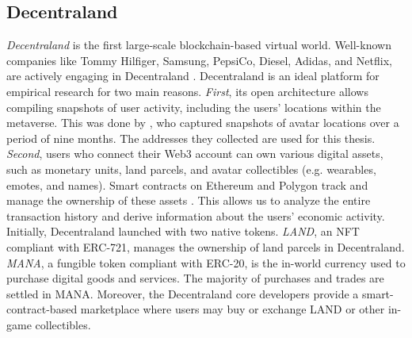 \documentclass[12pt,a4paper,titlepage,oneside,english]{article}
\begin{document}
\subsection{Decentraland}
\textit{Decentraland} is the first large-scale blockchain-based virtual world. Well-known companies like Tommy Hilfiger, Samsung, PepsiCo, Diesel, Adidas, and Netflix, are actively engaging in Decentraland  \citep{metaverse-retailing2023}.\newline
Decentraland is an ideal platform for empirical research for two main reasons.
\textit{First}, its open architecture allows compiling snapshots of user activity, including the users' locations  within the metaverse. This was done by \cite{metaverse-retailing2023}, who captured snapshots of avatar locations over a period of nine months. The addresses they collected are used for this thesis.
\textit{Second}, users who connect their Web3 account can own various digital assets, such as monetary units, land parcels, and avatar collectibles (e.g. wearables, emotes, and names). Smart contracts on Ethereum and Polygon track and manage the ownership of these assets \citep{goldbergschaer2023}. This allows us to analyze the entire transaction history and derive information about the users' economic activity. %
\newline
Initially, Decentraland launched with two native tokens. \textit{LAND}, an NFT compliant with ERC-721, manages the ownership of land parcels in Decentraland. \textit{MANA}, a fungible token compliant with ERC-20, is the in-world currency used to purchase digital goods and services. The majority of purchases and trades are settled in MANA. \newline 
Moreover, the Decentraland core developers provide a smart-contract-based marketplace where users may buy or exchange LAND or other in-game collectibles. %
 
\end{document}
